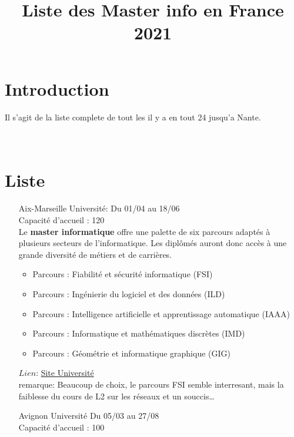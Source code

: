 \documentclass[a4paper,11pt]{article}
\title{\color{OrangeHaf} \Huge Liste des Master info en France\\2021}
\date{}
\newcommand{\e}{\'{e}}
\begin{document}
\pagecolor{BlackHaf}
    \maketitle
    \section{Introduction}
        Il s'agit de la liste complete de tout les il y a en tout 24 jusqu'a Nante.
        \\
        \\
        \\
    \section{Liste}
    \begin{enumerate}
        \item [\color{LightOrangeHaf} Aix-Marseille Université:] Du 01/04 au 18/06 
                \\Capacité d'accueil : 120
                \\ Le \textbf{master informatique} offre une palette de six parcours adaptés à plusieurs secteurs de l'informatique. Les diplômés auront donc accès à une grande diversité de métiers et de carrières.
                \begin{itemize}
                    \item Parcours : Fiabilité et sécurité informatique (FSI)
                    \item Parcours : Ingénierie du logiciel et des données (ILD)
                    \item Parcours : Intelligence artificielle et apprentissage automatique (IAAA)
                    \item Parcours : Informatique et mathématiques discrètes (IMD)
                    \item Parcours : Géométrie et informatique graphique (GIG)
                \end{itemize}
                $Lien$: \href{https://informatique-sciences.univ-amu.fr/master-informatique}{Site Université}\\
                remarque: Beaucoup de choix, le parcours FSI semble interresant, mais la faiblesse du cours de L2 sur les r\e seaux et un souccis\dots
\\
        \item [\color{LightOrangeHaf} Avignon Université] Du 05/03 au 27/08 
                \\Capacité d'accueil : 100

\end{enumerate}
\end{document}

